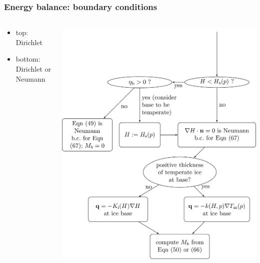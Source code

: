 \documentclass[hide notes,intlimits]{beamer}
\begin{document}
\begin{frame}
  \frametitle{Energy balance: boundary conditions}

  \begin{columns}[c]
    \begin{column}{0.5\linewidth}
      \begin{itemize}
      \item top: Dirichlet
      \item bottom: Dirichlet or Neumann
      \end{itemize}
    \end{column}

    \begin{column}{0.5\linewidth}
      \includegraphics[width=0.9\linewidth]{enthalpy-basal-bc}
    \end{column}
  \end{columns}
\end{frame}
\end{document}
